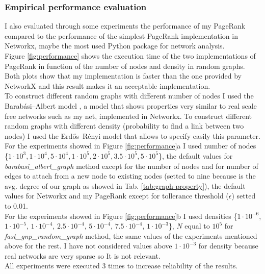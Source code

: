 \documentclass{article}
\begin{document}
\subsubsection{Empirical performance evaluation}

I also evaluated through some experiments the performance of my PageRank compared to the performance of the simplest PageRank implementation in Networkx, maybe the most used Python package for network analysis.\\ Figure \ref{fig:performance} shows the execution time of the two implementations of PageRank in function of the number of nodes  and density in random graphs. Both plots show that my implementation is faster than the one provided by NetworkX and this result makes it an acceptable implementation. \\ To construct different random graphs with different number of nodes I used the Barabási–Albert model \cite{Albert2002}, a model that shows properties very similar to real scale free networks such as my net, implemented in Networkx. To construct different random graphs with different density (probability to find a link between two nodes) I used the Erdős–Rényi model that allows to specify easily this parameter. \\ For the experiments showed in Figure \ref{fig:performance}a I used number of nodes \{$1\cdot10^{3}, 1\cdot10^{4}, 5\cdot10^{4}, 1\cdot10^{5}, 2\cdot10^{5}, 3.5\cdot10^{5}, 5\cdot10^{5}$\}, the default values for \textit{barabasi\_albert\_graph} method except for the number of nodes and for number of edges to attach from a new node to existing nodes (setted to nine because is the avg. degree of our graph as showed in Tab. \ref{tab:graph-property}), the default values for Networkx and my PageRank except for tollerance threshold ($\epsilon$) setted to 0.01. \\For the experiments showed in Figure \ref{fig:performance}b I used densities \{$1\cdot10^{-6}$, $1\cdot10^{-5}$, $1\cdot10^{-4}$, $2.5\cdot10^{-4}$, $5\cdot10^{-4}$, $7.5\cdot10^{-4}$, $1\cdot10^{-3}$\}, $N$ equal to $10^{5}$ for \textit{fast\_gnp\_random\_graph} method, the same values of the experiments mentioned above for the rest. I have not considered values above $1\cdot10^{-3}$ for density because real networks are very sparse so It is not relevant.\\ All experiments were executed 3 times to increase reliability of the results.
\end{document}

